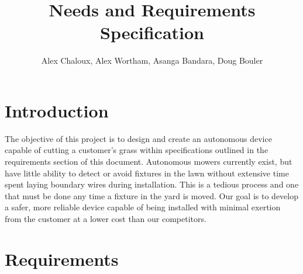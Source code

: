 \documentclass[12pt,letterpaper]{article}
\author{Alex Chaloux, Alex Wortham, Asanga Bandara, Doug Bouler}
\title{Needs and Requirements Specification}
\begin{document}
\reqstitlepage
\doublespacing

\section*{Introduction}

\begin{doublespace}
The objective of this project is to design and create an autonomous device capable of cutting a customer’s grass within specifications outlined in the requirements section of this document. Autonomous mowers currently exist, but have little ability to detect or avoid fixtures in the lawn without extensive time spent laying boundary wires during installation. This is a tedious process and one that must be done any time a fixture in the yard is moved. Our goal is to develop a safer, more reliable device capable of being installed with minimal exertion from the customer at a lower cost than our competitors. 
\end{doublespace}

\section*{Requirements}
\end{document}
